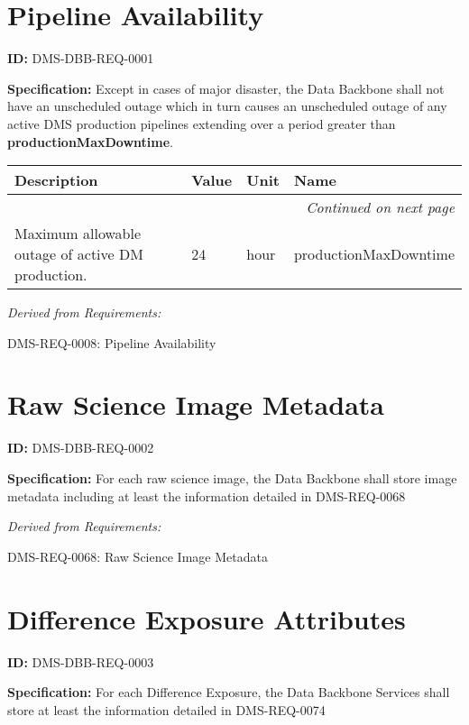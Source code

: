 \documentclass[SE,toc,lsstdraft]{lsstdoc}
\date{2019-06-11}
\makeatletter
\newcommand{\paramname}[1]{\hspace{0pt}#1}
\newcommand{\unitname}[1]{\hspace{0pt}#1}
\newenvironment{parameters}[0]{%
\setlength\LTleft{0pt}
\setlength\LTright{\fill}
\begin{small}
\begin{longtable}[]{|p{0.49\textwidth}|l|p{0.6in}|p{1.70in}@{}|}

\hline \textbf{Description} & \textbf{Value} & \textbf{Unit} & \textbf{Name} \\ \hline
\endhead

\hline \multicolumn{4}{r}{\emph{Continued on next page}} \\
\endfoot

\hline\hline
\endlastfoot
}{%
\hline
\end{longtable}
\end{small}
}
\makeatother
\begin{document}
\maketitle

\section{Pipeline Availability}

\label{DMS-DBB-REQ-0001}
\textbf{ID:} DMS-DBB-REQ-0001

\textbf{Specification:}
Except in cases of major disaster, the Data Backbone shall not have an unscheduled outage which in turn causes an unscheduled outage of any active DMS production pipelines extending over a period greater than \textbf{productionMaxDowntime}.

\begin{parameters}
Maximum allowable outage of active DM production.
&
24
&
\unitname{%
hour
}
&
\paramname{%
productionMaxDowntime
} \\\hline
\end{parameters}

\emph{Derived from Requirements:}

DMS-REQ-0008:
Pipeline Availability \newline

\section{Raw Science Image Metadata}

\label{DMS-DBB-REQ-0002}
\textbf{ID:} DMS-DBB-REQ-0002

\textbf{Specification:}
For each raw science image, the Data Backbone shall store image metadata including at least the information detailed in DMS-REQ-0068

\emph{Derived from Requirements:}

DMS-REQ-0068:
Raw Science Image Metadata \newline

\section{Difference Exposure Attributes}

\label{DMS-DBB-REQ-0003}
\textbf{ID:} DMS-DBB-REQ-0003

\textbf{Specification:}
For each Difference Exposure, the Data Backbone Services shall store at least the information detailed in DMS-REQ-0074
\end{document}
